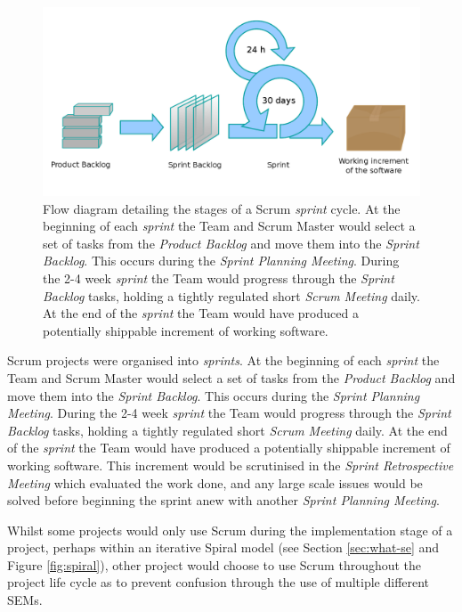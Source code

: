 \documentclass[final]{cmpreport}
\begin{document}
			\begin{figure}
				\centering
				\includegraphics[width=0.8\linewidth]{scrum.png}
				\caption[Scrum Methodology Sprint Cycle]{Flow diagram detailing the stages of a Scrum \emph{sprint} cycle. At the beginning of each \emph{sprint} the Team and Scrum Master would select a set of tasks from the \emph{Product Backlog} and move them into the \emph{Sprint Backlog}. This occurs during the \emph{Sprint Planning Meeting}. During the 2-4 week \emph{sprint} the Team would progress through the \emph{Sprint Backlog} tasks, holding a tightly regulated short \emph{Scrum Meeting} daily. At the end of the \emph{sprint} the Team would have produced a potentially shippable increment of working software.} \label{fig:scrum}
			\end{figure}
		
			Scrum projects were organised into \emph{sprints}. At the beginning of each \emph{sprint} the Team and Scrum Master would select a set of tasks from the \emph{Product Backlog} and move them into the \emph{Sprint Backlog}. This occurs during the \emph{Sprint Planning Meeting}. During the 2-4 week \emph{sprint} the Team would progress through the \emph{Sprint Backlog} tasks, holding a tightly regulated short \emph{Scrum Meeting} daily. At the end of the \emph{sprint} the Team would have produced a potentially shippable increment of working software. This increment would be scrutinised in the \emph{Sprint Retrospective Meeting} which evaluated the work done, and any large scale issues would be solved before beginning the sprint anew with another \emph{Sprint Planning Meeting}.
			
			Whilst some projects would only use Scrum during the implementation stage of a project, perhaps within an iterative Spiral model (see Section \ref{sec:what-se} and Figure \ref{fig:spiral}), other project would choose to use Scrum throughout the project life cycle as to prevent confusion through the use of multiple different SEMs. 
			
\end{document}
